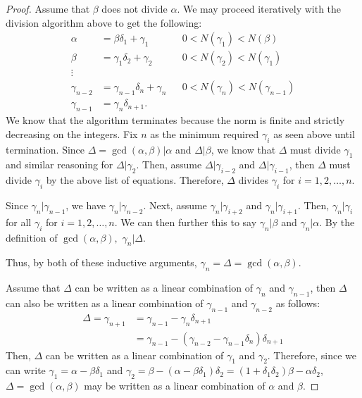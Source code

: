 \documentclass[12pt]{amsart}
\theoremstyle{definition}
\theoremstyle{remark}
\begin{document}
\begin{proof}
    Assume that $\beta$ does not divide $\alpha$. We may proceed iteratively with the division algorithm above to get the following:
    \begin{align*}
        \alpha &= \beta \delta_1 + \gamma_1  &&0<N(\gamma_1)<N(\beta)\\
        \beta &= \gamma_1\delta_2 + \gamma_2  &&0<N(\gamma_2)<N(\gamma_1)\\
        \vdots\\
        \gamma_{n-2} &= \gamma_{n-1}\delta_{n} + \gamma_{n}  &&0<N(\gamma_{n})<N(\gamma_{n-1})\\
        \gamma_{n-1} &= \gamma_{n}\delta_{n+1}.
    \end{align*}
    We know that the algorithm terminates because the norm is finite and strictly decreasing on the integers. Fix $n$ as the minimum required $\gamma_i$ as seen above until termination. Since $\Delta=\gcd(\alpha,\beta) | \alpha$ and $\Delta|\beta$, we know that $\Delta$ must divide $\gamma_1$ and similar reasoning for $\Delta | \gamma_2$. Then, assume $\Delta | \gamma_{i-2}$ and $\Delta | \gamma_{i-1}$, then $\Delta$ must divide $\gamma_i$ by the above list of equations. Therefore, $\Delta$ divides $\gamma_i$ for $i=1,2,\dots,n$.
    
    Since $\gamma_n | \gamma_{n-1}$, we have $\gamma_n | \gamma_{n-2}$. Next, assume $\gamma_n | \gamma_{i+2}$ and $\gamma_n | \gamma_{i+1}$. Then, $\gamma_n | \gamma_i$ for all $\gamma_i$ for $i=1,2,\dots,n$. We can then further this to say $\gamma_n | \beta$ and $\gamma_n | \alpha$. By the definition of $\gcd(\alpha,\beta),$ $\gamma_n | \Delta$.
    
    Thus, by both of these inductive arguments, $\gamma_n = \Delta = \gcd(\alpha,\beta)$.
    
    Assume that $\Delta$ can be written as a linear combination of $\gamma_n$ and $\gamma_{n-1}$, then $\Delta$ can also be written as a linear combination of $\gamma_{n-1}$ and $\gamma_{n-2}$ as follows:
    \begin{align*}
        \Delta = \gamma_{n+1} &= \gamma_{n-1}-\gamma_n\delta_{n+1}\\
        &= \gamma_{n-1}-(\gamma_{n-2}-\gamma_{n-1}\delta_n)\delta_{n+1}
    \end{align*}
    Then, $\Delta$ can be written as a linear combination of $\gamma_1$ and $\gamma_2$. Therefore, since we can write $\gamma_1=\alpha-\beta\delta_1$ and $\gamma_2 = \beta - (\alpha-\beta\delta_1)\delta_2 = (1+\delta_1\delta_2)\beta - \alpha\delta_2$, $\Delta=\gcd(\alpha,\beta)$ may be written as a linear combination of $\alpha$ and $\beta$.
\end{proof}
\end{document}

